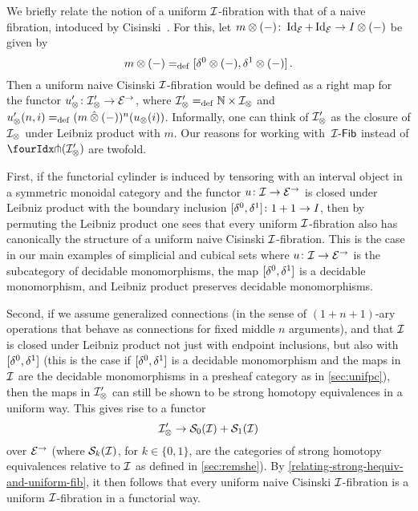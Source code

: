 \documentclass[reqno,10pt,a4paper,oneside,draft]{amsart}
\begin{document}
\begin{remark} \label{cisinski-remark}
We briefly relate the notion of a uniform $\cal{I}$-fibration with that of a naive fibration, intoduced by Cisinski~\cite{cisinski-asterisque}.
For this, let $m \otimes (-)  \co \Id_\catE + \Id_\catE \to \interval \otimes (-)$ be given by
\[
  m \otimes (-) \defeq [\lcyl \otimes (-), \rcyl \otimes (-)] \, .
\]
Then a uniform naive Cisinski $\cal{I}$-fibration would be defined as a right map for the functor $u_\otimes' \co \cal{I}_\otimes' \to \catE^\to$, where $\cal{I}_\otimes' \defeq \mathbb{N} \times \cal{I}_\otimes$ and $u_\otimes'(n, i) \defeq (m \hatotimes (-))^n(u_\otimes(i))$.
Informally, one can think of
$\cal{I}_\otimes'$ as the closure of $\cal{I}_\otimes$ under Leibniz product with $m$.
Our reasons for working with~$\Fib[\cal{I}]$ instead of $\liftr{(\cal{I}_\otimes')}$ are twofold.

First, if the functorial cylinder is induced by tensoring with an interval object in a symmetric monoidal category and the functor $u \co \cal{I} \to \catE^\to$ is closed under Leibniz product with the boundary inclusion $[\lcyl, \rcyl] \co 1 + 1 \to \interval$, then by permuting the Leibniz product one sees that every uniform $\cal{I}$-fibration also has canonically the structure of a uniform naive Cisinski $\cal{I}$-fibration.
This is the case in our main examples of simplicial and cubical sets where $u \co \cal{I} \to \catE^\to$ is the subcategory of decidable monomorphisms, the map $[\lcyl, \rcyl]$ is a decidable monomorphism, and Leibniz product preserves decidable monomorphisms.

Second, if we assume generalized connections (in the sense of $(1+n+1)$-ary operations that behave as connections for fixed middle $n$ arguments), and that $\cal{I}$ is closed under Leibniz product not just with endpoint inclusions, but also with $[\lcyl, \rcyl]$ (this is the case if $[\lcyl, \rcyl]$ is a decidable monomorphism and the maps in $\cal{I}$ are the decidable monomorphisms in a presheaf category as in \cref{sec:unifpc}), then the maps in $\cal{I}_\otimes'$ can still be shown to be strong homotopy equivalences in a uniform way.
This gives rise to a functor
\[
  \cal{I}_\otimes' \to \cal{S}_0(\cal{I}) + \cal{S}_1(\cal{I})
\]
over $\catE^\to$ (where $\cal{S}_k(\cal{I})$, for $k \in \{0,1\}$, are the categories of strong homotopy equivalences relative to $\cal{I}$ as defined in \cref{sec:remshe}).
By \cref{relating-strong-hequiv-and-uniform-fib}, it then follows that every uniform naive Cisinski $\cal{I}$-fibration is a uniform $\cal{I}$-fibration in a functorial way.
\end{remark}
\end{document}
